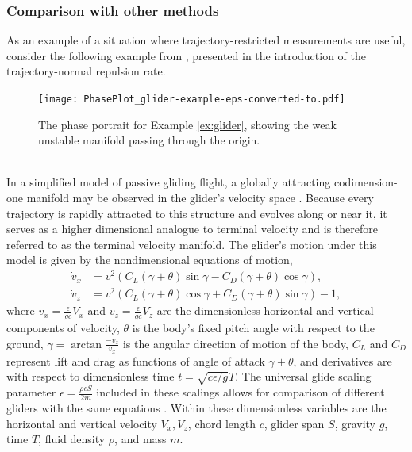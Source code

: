 \documentclass[twocolumn]{svjour3}
\begin{document}
\subsubsection{Comparison with other methods}
As an example of a situation where trajectory-restricted measurements are useful, consider the following example from \cite{haller_variational_2011}, presented in the introduction of the trajectory-normal repulsion rate.

\begin{figure}
\centering
\texttt{[image: PhasePlot\_glider-example-eps-converted-to.pdf]}
\caption{The phase portrait for Example \ref{ex:glider}, showing the weak unstable manifold passing through the origin.}
\label{fig:glider}
\end{figure}

 \\
In a simplified model of passive gliding flight, a globally attracting codimension-one manifold may be observed in the glider's velocity space \cite{yeaton_global_2017,nave2018global}. Because every trajectory is rapidly attracted to this structure and evolves along or near it, it serves as a higher dimensional analogue to terminal velocity and is therefore referred to as the terminal velocity manifold. The glider's motion under this model is given by the nondimensional equations of motion,
\begin{equation}
\begin{aligned}
\dot{v}_x &= v^2\left(C_L\left(\gamma+\theta\right)\sin\gamma - C_D\left(\gamma+\theta\right)\cos\gamma\right), \\
\dot{v}_z &= v^2\left(C_L\left(\gamma+\theta\right)\cos\gamma + C_D\left(\gamma+\theta\right)\sin\gamma\right) - 1,
\end{aligned}
\end{equation}
where $v_x=\tfrac{\epsilon}{gc}V_x$ and $v_z=\tfrac{\epsilon}{gc}V_z$ are the dimensionless horizontal and vertical components of velocity, $\theta$ is the body's fixed pitch angle with respect to the ground, $\gamma=\arctan\tfrac{-v_z}{v_x}$ is the angular direction of motion of the body, $C_L$ and $C_D$ represent lift and drag as functions of angle of attack $\gamma+\theta$, and derivatives are with respect to dimensionless time $t=\sqrt{c\epsilon/g}T$. The universal glide scaling parameter $\epsilon=\tfrac{\rho c S}{2m}$ included in these scalings allows for comparison of different gliders with the same equations \cite{yeaton_global_2017}. Within these dimensionless variables are the horizontal and vertical velocity $V_x,V_z$, chord length $c$, glider span $S$, gravity $g$, time $T$, fluid density $\rho$, and mass $m$.
\end{document}
